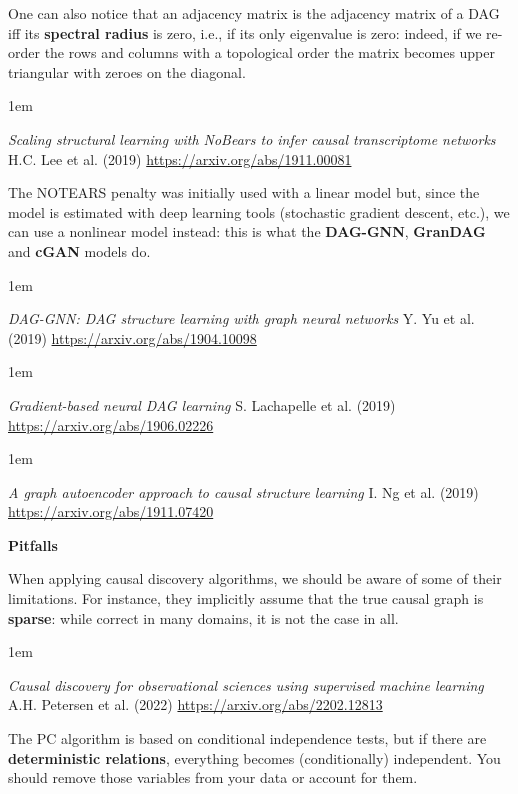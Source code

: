 \documentclass[a5paper]{article}
\let\d\textbf
\newenvironment{reference}{%
  \medskip\goodbreak
  \parskip 0pt
  \raggedright
  \leftskip 1em
  \obeylines
}{\par\medskip\goodbreak}
\def\subsection#1{{\par\bigskip\goodbreak\large\bfseries #1\par}}
\begin{document}
One can also notice that an adjacency matrix is the adjacency matrix of a DAG iff
its \d{spectral radius} is zero, i.e., if its only eigenvalue is zero:
indeed, if we re-order the rows and columns with a topological order
the matrix becomes upper triangular with zeroes on the diagonal.

\begin{reference}
  \emph{Scaling structural learning with NoBears to  infer causal transcriptome networks}
  H.C. Lee et al. (2019)
  \url{https://arxiv.org/abs/1911.00081}
\end{reference}

The NOTEARS penalty was initially used with a linear model but,
since the model is estimated with deep learning tools (stochastic gradient descent, etc.),
we can use a nonlinear model instead:
this is what the \d{DAG-GNN}, \d{GranDAG} and \d{cGAN} models do.

\begin{reference}
  \emph{DAG-GNN: DAG structure learning  with graph neural networks}
  Y. Yu et al. (2019)
  \url{https://arxiv.org/abs/1904.10098}
\end{reference}

\begin{reference}
  \emph{Gradient-based neural DAG learning}
  S. Lachapelle et al. (2019)
  \url{https://arxiv.org/abs/1906.02226}
\end{reference}

\begin{reference}
  \emph{A graph autoencoder approach  to causal structure learning}
  I. Ng et al. (2019)
  \url{https://arxiv.org/abs/1911.07420}
\end{reference}

\subsection{Pitfalls}

When applying causal discovery algorithms, we should be aware of some of their limitations.
For instance, they implicitly assume that the true causal graph is \d{sparse}:
while correct in many domains, it is not the case in all.

\begin{reference}
  \emph{Causal discovery for observational sciences using supervised machine learning}
  A.H. Petersen et al. (2022)
  \url{https://arxiv.org/abs/2202.12813}
\end{reference}

The PC algorithm is based on conditional independence tests,
but if there are \d{deterministic relations}, everything becomes (conditionally) independent.
You should remove those variables from your data or account for them.
\end{document}
